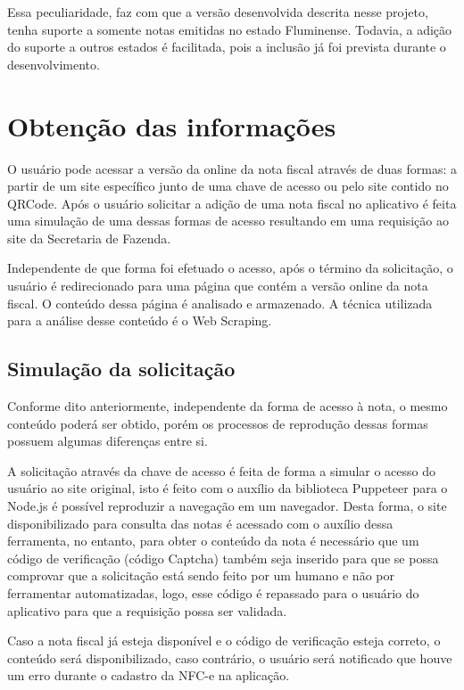 Essa peculiaridade, faz com que a versão desenvolvida descrita nesse projeto, tenha suporte a somente notas emitidas no estado Fluminense. Todavia, a adição do suporte a outros estados é facilitada, pois a inclusão já foi prevista durante o desenvolvimento.

\section{Obtenção das informações}
\label{obtencaoInformacoes}

O usuário pode acessar a versão da online da nota fiscal através de duas formas: a partir de um site específico junto de uma chave de acesso ou pelo site contido no QRCode. Após o usuário solicitar a adição de uma nota fiscal no aplicativo é feita uma simulação de uma dessas formas de acesso resultando em uma requisição ao site da Secretaria de Fazenda.

Independente de que forma foi efetuado o acesso, após o término da solicitação, o usuário é redirecionado para uma página que contém a versão online da nota fiscal. O conteúdo dessa página é analisado e armazenado. A técnica utilizada para a análise desse conteúdo é o Web Scraping.

\subsection{Simulação da solicitação}

Conforme dito anteriormente, independente da forma de acesso à nota, o mesmo conteúdo poderá ser obtido, porém os processos de reprodução dessas formas possuem algumas diferenças entre si.

A solicitação através da chave de acesso é feita de forma a simular o acesso do usuário ao site original, isto é feito com o auxílio da biblioteca Puppeteer para o Node.js é possível reproduzir a navegação em um navegador. Desta forma, o site disponibilizado para consulta das notas é acessado com o auxílio dessa ferramenta, no entanto, para obter o conteúdo da nota é necessário que um código de verificação (código Captcha) também seja inserido para que se possa comprovar que a solicitação está sendo feito por um humano e não por ferramentar automatizadas, logo, esse código é repassado para o usuário do aplicativo para que a requisição possa ser validada.


Caso a nota fiscal já esteja disponível e o código de verificação esteja correto, o conteúdo será disponibilizado, caso contrário, o usuário será notificado que houve um erro durante o cadastro da NFC-e na aplicação.


